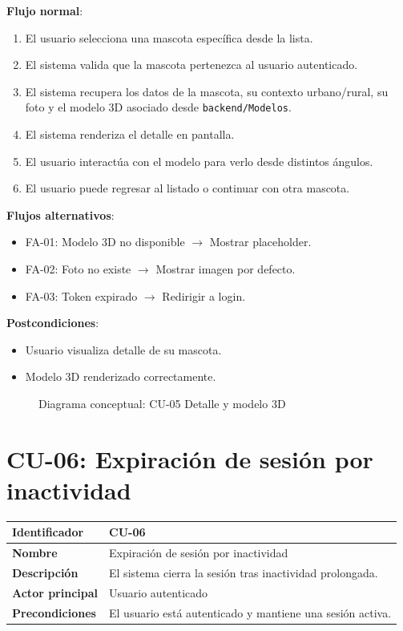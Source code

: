 \documentclass[12pt,a4paper]{article}
\begin{document}
\vspace{0.5em}

\textbf{Flujo normal}:
\begin{enumerate}[leftmargin=*]
    \item El usuario selecciona una mascota espec\'ifica desde la lista.
    \item El sistema valida que la mascota pertenezca al usuario autenticado.
    \item El sistema recupera los datos de la mascota, su contexto urbano/rural, su foto y el modelo 3D asociado desde \texttt{backend/Modelos}.
    \item El sistema renderiza el detalle en pantalla.
    \item El usuario interact\'ua con el modelo para verlo desde distintos \'angulos.
    \item El usuario puede regresar al listado o continuar con otra mascota.
\end{enumerate}

\textbf{Flujos alternativos}:
\begin{itemize}[leftmargin=*]
    \item FA-01: Modelo 3D no disponible $\rightarrow$ Mostrar placeholder.
    \item FA-02: Foto no existe $\rightarrow$ Mostrar imagen por defecto.
    \item FA-03: Token expirado $\rightarrow$ Redirigir a login.
\end{itemize}

\textbf{Postcondiciones}:
\begin{itemize}[leftmargin=*]
    \item Usuario visualiza detalle de su mascota.
    \item Modelo 3D renderizado correctamente.
\end{itemize}

\begin{figure}[h]
\centering
{}
\caption{Diagrama conceptual: CU-05 Detalle y modelo 3D}
\end{figure}

\newpage

\section{CU-06: Expiraci\'on de sesi\'on por inactividad}

\begin{tabular}{|p{3.5cm}|p{10cm}|}
\hline
\textbf{Identificador} & CU-06 \\
\hline
\textbf{Nombre} & Expiraci\'on de sesi\'on por inactividad \\
\hline
\textbf{Descripci\'on} & El sistema cierra la sesi\'on tras inactividad prolongada. \\
\hline
\textbf{Actor principal} & Usuario autenticado \\
\hline
\textbf{Precondiciones} & El usuario est\'a autenticado y mantiene una sesi\'on activa. \\
\hline
\end{tabular}
\end{document}
